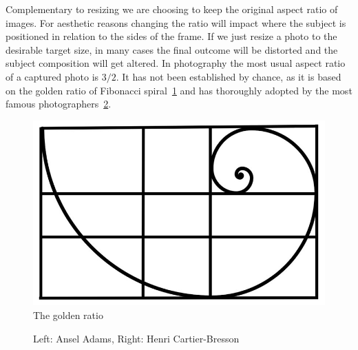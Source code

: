 Complementary to resizing we are choosing to keep the original aspect ratio of images. 
For aesthetic reasons changing the ratio will impact where the subject is positioned in relation to the sides of the frame. 
If we just resize a photo to the desirable target size, in many cases the final outcome will be distorted and the subject composition will get altered.
In photography the most usual aspect ratio of a captured photo is $3/2$. It has not been established by chance, as it is based on the golden ratio of Fibonacci spiral~\ref{c4:golden_ratio} and has thoroughly adopted by the most famous photographers~\ref{c4:golden_photographer}.

\begin{figure}[ht!]
    \centering  
    \includegraphics[width=.3\textwidth]{figures/chap4/figures/golden_ratio}
    \caption{The golden ratio}
    \label{c4:golden_ratio}
\end{figure}


\begin{figure}[ht!]
    \centering  
    \caption{Left: Ansel Adams, Right: Henri Cartier-Bresson}
    \label{c4:golden_photographer}
\end{figure}

